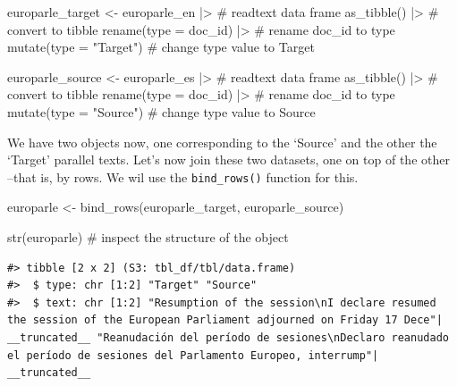 \documentclass[
  letterpaper,
]{latex/krantz}
\newenvironment{Shaded}{\begin{snugshade}}{\end{snugshade}}
\newcommand{\AttributeTok}[1]{\textcolor[rgb]{0.40,0.45,0.13}{#1}}
\newcommand{\CommentTok}[1]{\textcolor[rgb]{0.37,0.37,0.37}{#1}}
\newcommand{\FunctionTok}[1]{\textcolor[rgb]{0.28,0.35,0.67}{#1}}
\newcommand{\NormalTok}[1]{\textcolor[rgb]{0.00,0.23,0.31}{#1}}
\newcommand{\OtherTok}[1]{\textcolor[rgb]{0.00,0.23,0.31}{#1}}
\newcommand{\SpecialCharTok}[1]{\textcolor[rgb]{0.37,0.37,0.37}{#1}}
\newcommand{\StringTok}[1]{\textcolor[rgb]{0.13,0.47,0.30}{#1}}
\begin{document}
\begin{Shaded}
\begin{Highlighting}[]
\NormalTok{europarle\_target }\OtherTok{\textless{}{-}} 
\NormalTok{  europarle\_en }\SpecialCharTok{|\textgreater{}} \CommentTok{\# readtext data frame}
  \FunctionTok{as\_tibble}\NormalTok{() }\SpecialCharTok{|\textgreater{}} \CommentTok{\# convert to tibble}
  \FunctionTok{rename}\NormalTok{(}\AttributeTok{type =}\NormalTok{ doc\_id) }\SpecialCharTok{|\textgreater{}} \CommentTok{\# rename doc\_id to type}
  \FunctionTok{mutate}\NormalTok{(}\AttributeTok{type =} \StringTok{"Target"}\NormalTok{) }\CommentTok{\# change type value to \textquotesingle{}Target\textquotesingle{}}

\NormalTok{europarle\_source }\OtherTok{\textless{}{-}} 
\NormalTok{  europarle\_es }\SpecialCharTok{|\textgreater{}} \CommentTok{\# readtext data frame}
  \FunctionTok{as\_tibble}\NormalTok{() }\SpecialCharTok{|\textgreater{}} \CommentTok{\# convert to tibble}
  \FunctionTok{rename}\NormalTok{(}\AttributeTok{type =}\NormalTok{ doc\_id) }\SpecialCharTok{|\textgreater{}} \CommentTok{\# rename doc\_id to type}
  \FunctionTok{mutate}\NormalTok{(}\AttributeTok{type =} \StringTok{"Source"}\NormalTok{) }\CommentTok{\# change type value to \textquotesingle{}Source\textquotesingle{}}
\end{Highlighting}
\end{Shaded}

We have two objects now, one corresponding to the `Source' and the other
the `Target' parallel texts. Let's now join these two datasets, one on
top of the other --that is, by rows. We wil use the
\texttt{bind\_rows()} function for this.

\begin{Shaded}
\begin{Highlighting}[]
\NormalTok{europarle }\OtherTok{\textless{}{-}} 
  \FunctionTok{bind\_rows}\NormalTok{(europarle\_target, europarle\_source)}

\FunctionTok{str}\NormalTok{(europarle) }\CommentTok{\# inspect the structure of the object}
\end{Highlighting}
\end{Shaded}

\begin{verbatim}
#> tibble [2 x 2] (S3: tbl_df/tbl/data.frame)
#>  $ type: chr [1:2] "Target" "Source"
#>  $ text: chr [1:2] "Resumption of the session\nI declare resumed the session of the European Parliament adjourned on Friday 17 Dece"| __truncated__ "Reanudación del período de sesiones\nDeclaro reanudado el período de sesiones del Parlamento Europeo, interrump"| __truncated__
\end{verbatim}
\end{document}
